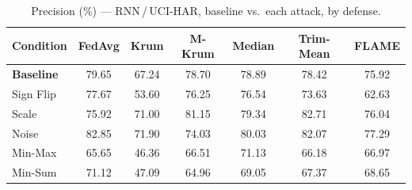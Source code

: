 \begin{table}[t]
\centering
\caption{Precision (\%) --- RNN\,/\,UCI-HAR, baseline vs.\ each attack, by defense.}
\label{tab:rnn_precision}
\footnotesize
\begin{tabular}{lcccccc}
\toprule
Condition & FedAvg & Krum & M-Krum & Median & Trim-Mean & FLAME \\
\midrule
\textbf{Baseline} & 79.65 & 67.24 & 78.70 & 78.89 & 78.42 & 75.92 \\
\midrule
Sign Flip & 77.67 & 53.60 & 76.25 & 76.54 & 73.63 & 62.63 \\
Scale & 75.92 & 71.00 & 81.15 & 79.34 & 82.71 & 76.04 \\
Noise & 82.85 & 71.90 & 74.03 & 80.03 & 82.07 & 77.29 \\
Min-Max & 65.65 & 46.36 & 66.51 & 71.13 & 66.18 & 66.97 \\
Min-Sum & 71.12 & 47.09 & 64.96 & 69.05 & 67.37 & 68.65 \\
\bottomrule
\end{tabular}
\end{table}
